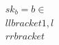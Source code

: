 \documentclass[preview]{standalone}
\begin{document}
\begin{align*}
sk_b = b \in \\llbracket 1, l \\rrbracket
\end{align*}
\end{document}
